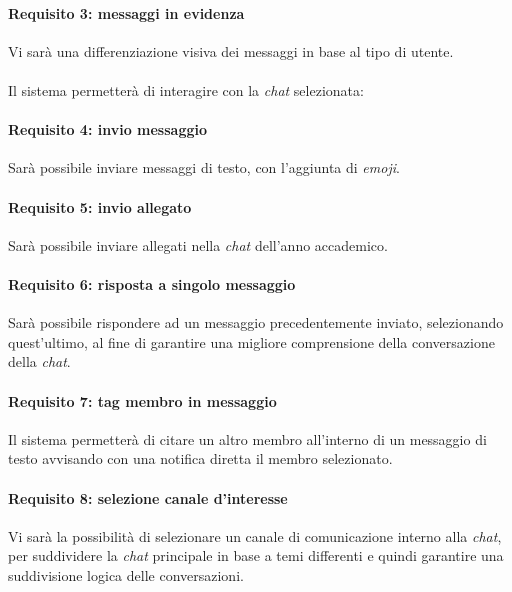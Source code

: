 \paragraph{Requisito 3: messaggi in evidenza\\}
Vi sarà una differenziazione visiva dei messaggi in base al tipo di utente.\\
\\
Il sistema permetterà di interagire con la \emph{chat} selezionata:

\paragraph{Requisito 4: invio messaggio\\}
Sarà possibile inviare messaggi di testo, con l’aggiunta di \emph{emoji}.

\paragraph{Requisito 5: invio allegato\\}
Sarà possibile inviare allegati nella \emph{chat} dell’anno accademico.

\paragraph{Requisito 6: risposta a singolo messaggio\\}
Sarà possibile rispondere ad un messaggio precedentemente inviato, selezionando quest’ultimo, al fine di garantire una migliore comprensione della conversazione della \emph{chat}.

\paragraph{Requisito 7: tag membro in messaggio\\}
Il sistema permetterà di citare un altro membro all’interno di un messaggio di testo avvisando con una notifica diretta il membro selezionato.

\paragraph{Requisito 8: selezione canale d'interesse\\}
Vi sarà la possibilità di selezionare un canale di comunicazione interno alla \emph{chat}, per suddividere la \emph{chat} principale in base a temi differenti e quindi garantire una suddivisione logica delle conversazioni.

